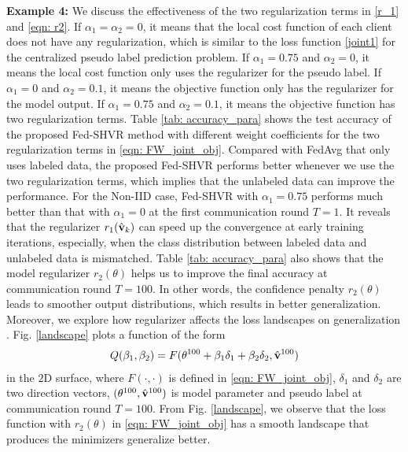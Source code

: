 \documentclass[twoside,journal]{IEEEtran}
\def\VectorFont{\bf}
\newcommand{\vv}{{\VectorFont v}}
\begin{document}
\textbf{Example 4:} We discuss the effectiveness of the two regularization terms in \eqref{r_1} and \eqref{eqn: r2}. If $\alpha_1=\alpha_2=0$, it means that  the local cost function of each client does not have any regularization, which is similar to the loss function \eqref{joint1} for the centralized pseudo label prediction problem. If $\alpha_1=0.75$ and $\alpha_2=0$, it means the local cost function only uses the regularizer for the pseudo label. If $\alpha_1=0$ and $\alpha_2=0.1$, it means the objective function only has the regularizer for the model output. If $\alpha_1=0.75$ and $\alpha_2=0.1$, it means the objective function has  two regularization terms. Table \ref{tab: accuracy_para} shows the test accuracy of the proposed Fed-SHVR method with different weight
coefficients for the two regularization terms in \eqref{eqn: FW_joint_obj}. Compared with FedAvg  that only uses labeled data, the proposed Fed-SHVR performs better whenever we use the two regularization terms, which implies that the unlabeled data can improve the performance. For the Non-IID case,   Fed-SHVR with $\alpha_1=0.75$ performs much better than that with $\alpha_1=0$ at the first communication round $T=1$. It reveals that the regularizer $r_1(\hat{\vv}_k)$ can speed up the convergence at early training iterations, especially, when the class distribution between labeled data and unlabeled data is  mismatched. Table \ref{tab: accuracy_para} also shows that the model regularizer $r_2({\theta})$ helps us to improve the final accuracy at communication round $T=100$. In other words, the confidence penalty $r_2({\theta})$  leads to smoother
output distributions, which results in better generalization. Moreover, we explore how regularizer  affects the loss landscapes on generalization \cite{li2018visualizing}. Fig. \ref{landscape} plots a function of the form
\begin{align}\label{Q1}
Q(\beta_1,\beta_2)=F(\theta^{100}+\beta_1\delta_1+\beta_2\delta_2,\hat{\vv}^{100})
\end{align}
 in the $2$D surface, where $F(\cdot,\cdot)$ is defined in \eqref{eqn: FW_joint_obj}, $\delta_1$ and $\delta_2$ are two direction vectors, $(\theta^{100},\hat{\vv}^{100})$ is model parameter and pseudo label at  communication round $T=100$. From Fig. \ref{landscape}, we observe that the loss function with $r_2({\theta})$ in \eqref{eqn: FW_joint_obj} has a smooth landscape that produces the minimizers generalize better.
\end{document}
